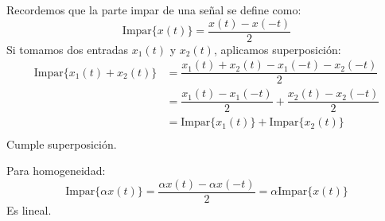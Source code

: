 \begin{enumerate}[label=\color{red}\textbf{\arabic*)}]
\begin{enumerate}[label=\color{red}\textbf{\alph*)}]
            Recordemos que la parte impar de una señal se define como: \[
            \mathrm{Impar}\{x(t)\} =\dfrac{x(t)-x(-t)}{2}
            \] 
            Si tomamos dos entradas $x_1(t)$ y $x_2(t)$, aplicamos superposición: \[
           \begin{aligned}
               \mathrm{Impar}\{x_1(t)+x_2(t)\}&= \dfrac{x_1(t)+x_2(t)-x_1(-t)-x_2(-t)}{2} \\
               &= \dfrac{x_1(t)-x_1(-t)}{2} +\dfrac{x_2(t)-x_2(-t)}{2}\\
               &= \mathrm{Impar}\{x_1(t)\} +\mathrm{Impar}\{x_2(t)\}  \\
           \end{aligned} 
            \] 
            Cumple superposición.

            Para homogeneidad: \[
            \mathrm{Impar}\{\alpha x(t)\} =\dfrac{\alpha x(t)-\alpha x(-t)}{2}=\alpha\mathrm{Impar}\{x(t)\} 
            \] 
            Es lineal.


\end{enumerate}
\end{enumerate}
